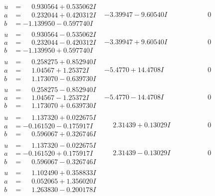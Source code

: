 \documentclass[1p]{elsarticle_modified}
\theoremstyle{definition}
\begin{document}
$$\begin{array}{c|c|c}
\begin{aligned}
u &= \phantom{-}0.930564 + 0.535062 I \\
a &= \phantom{-}0.232044 + 0.420312 I \\
b &= -1.139950 - 0.597740 I\end{aligned}
 & -3.39947 - 9.60540 I & \phantom{-0.000000 } 0 \\ \hline\begin{aligned}
u &= \phantom{-}0.930564 - 0.535062 I \\
a &= \phantom{-}0.232044 - 0.420312 I \\
b &= -1.139950 + 0.597740 I\end{aligned}
 & -3.39947 + 9.60540 I & \phantom{-0.000000 } 0 \\ \hline\begin{aligned}
u &= \phantom{-}0.258275 + 0.852940 I \\
a &= \phantom{-}1.04567 + 1.25372 I \\
b &= \phantom{-}1.173070 - 0.639730 I\end{aligned}
 & -5.4770 + 14.4708 I & \phantom{-0.000000 } 0 \\ \hline\begin{aligned}
u &= \phantom{-}0.258275 - 0.852940 I \\
a &= \phantom{-}1.04567 - 1.25372 I \\
b &= \phantom{-}1.173070 + 0.639730 I\end{aligned}
 & -5.4770 - 14.4708 I & \phantom{-0.000000 } 0 \\ \hline\begin{aligned}
u &= \phantom{-}1.137320 + 0.022675 I \\
a &= -0.161520 - 0.175917 I \\
b &= \phantom{-}0.596067 + 0.326746 I\end{aligned}
 & \phantom{-}2.31439 + 0.13029 I & \phantom{-0.000000 } 0 \\ \hline\begin{aligned}
u &= \phantom{-}1.137320 - 0.022675 I \\
a &= -0.161520 + 0.175917 I \\
b &= \phantom{-}0.596067 - 0.326746 I\end{aligned}
 & \phantom{-}2.31439 - 0.13029 I & \phantom{-0.000000 } 0 \\ \hline\begin{aligned}
u &= \phantom{-}1.102490 + 0.358833 I \\
a &= \phantom{-}0.052065 + 1.356020 I \\
b &= \phantom{-}1.263830 - 0.200178 I\end{aligned}

\end{array}$$
\end{document}
